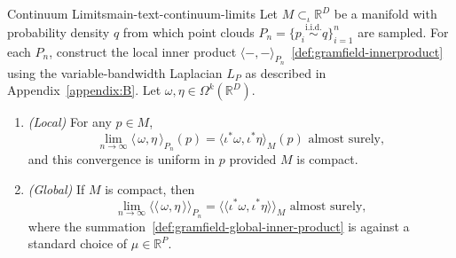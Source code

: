 \documentclass{article}
\newcommand{\R}{\mathbb{R}}
\newcommand{\llangle}{\langle \! \langle}
\newcommand{\rrangle}{\rangle \! \rangle}
\let\todo\undefined
\let\todo\undefined
\newcommand{\todo}[1][]{}
\theoremstyle{remark}
\theoremstyle{plain}
\begin{document}
\begin{informalthm}{Continuum Limits}{main-text-continuum-limits}
    Let $M \subset_{\iota} \R^D$ be a manifold with probability density \( q \) from which point clouds $P_{n}=\{ p_{i} \overset{\text{i.i.d.}}{\sim} q \}_{i=1}^n$ are sampled. For each $P_n$, construct the local inner product \( \langle -,-  \rangle_{P_{n}}  \)~\ref{def:gramfield-innerproduct} using the variable-bandwidth Laplacian \( L_{P} \) as described in Appendix~\ref{appendix:B}.  Let $\omega, \eta \in \Omega^k(\mathbb{R}^{D})$. %
  
    \begin{enumerate}
        \item \textit{(Local)}  For any $p \in M$,
    \begin{equation}
        \lim_{n \to \infty} \langle\, \omega, \eta \, \rangle_{P_n}(p) = \langle \iota^*\omega, \iota^*\eta\rangle_M(p) \text{ almost surely},
        \label{eqn:main-text-local-continuum}
    \end{equation} and this convergence is uniform in \( p \) provided \( M \) is compact.
        \item \textit{(Global)} If \( M \) is compact, then
    \begin{equation}
        \lim_{n \to \infty} \llangle\, \omega, \eta \, \rrangle_{P_n} = \llangle \iota^*\omega, \iota^*\eta\rrangle_M \text{ almost surely},
        \label{eqn:main-text-global-continuum}
    \end{equation} where the summation~\eqref{def:gramfield-global-inner-product} is against a standard choice of \( \mu \in \mathbb{R}^{P} \).
    
    \end{enumerate}
   
\end{informalthm} 
\end{document}
